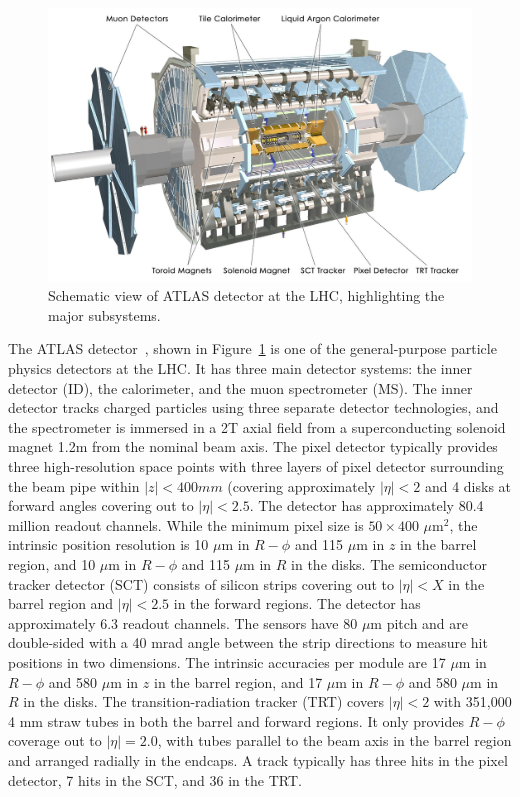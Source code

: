 \begin{figure}[!htb]
\begin{center}
\includegraphics[height=0.49\textwidth]{introduction_figs/0803012_05-A4-at-144-dpi.jpg}
\caption[]{Schematic view of ATLAS detector at the LHC, highlighting the major subsystems.}
\label{fig:pas:intro:atlas}
\end{center}
\end{figure}

The ATLAS detector~\cite{Aad:2008zzm}, shown in Figure~\ref{fig:pas:intro:atlas} is one of the general-purpose particle physics
detectors at the LHC.
It has three main detector systems: the inner detector (ID), the calorimeter,
and the muon spectrometer (MS).
%
The inner detector tracks charged particles using three separate detector
technologies, and the spectrometer is immersed in a 2T axial field from a
superconducting solenoid magnet 1.2m from the nominal beam axis.
The pixel detector typically provides three high-resolution space points
with three layers of pixel detector surrounding the beam pipe within
$|z|<400 mm$ (covering approximately $|\eta|<2$ and 4 disks at forward
angles covering out to $|\eta|<2.5$.
The detector has approximately 80.4 million readout channels.
While the minimum pixel size is $50 \times 400$ $\mu$m$^2$, the intrinsic
position resolution is 10 $\mu\mathrm{m}$ in $R-\phi$ and 115  $\mu\mathrm{m}$ in $z$
in the barrel region, and 10 $\mu\mathrm{m}$ in $R-\phi$ and 115  $\mu\mathrm{m}$ in $R$
in the disks.
The semiconductor tracker detector (SCT) consists of silicon strips covering out to
$|\eta|<X$ in the barrel region and $|\eta|<2.5$ in the forward regions.
The detector has approximately 6.3 readout channels.
The sensors have 80 $\mu$m pitch and are 
double-sided with a 40 mrad angle between the strip
directions to measure hit positions in two dimensions.
The intrinsic accuracies per module are
17 $\mu\mathrm{m}$ in $R-\phi$ and 580  $\mu\mathrm{m}$ in $z$
in the barrel region, and 17 $\mu\mathrm{m}$ in $R-\phi$ and 580  $\mu\mathrm{m}$ in $R$
in the disks.
The transition-radiation tracker (TRT) covers $|\eta|<2$ with 351,000 4 mm straw tubes in
both the barrel and forward regions.
It only provides $R-\phi$ coverage out to $|\eta|=2.0$, with tubes parallel to the beam 
axis in the barrel region and arranged radially in the endcaps.
A track typically has three hits in the pixel detector, 7 hits in the SCT, and 36 in the
TRT.

